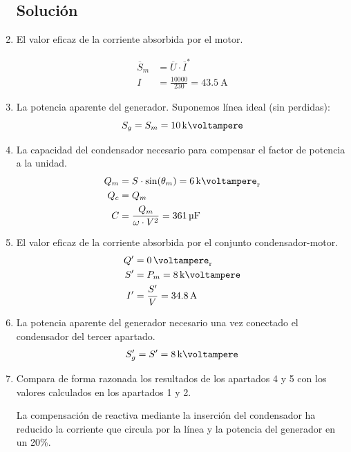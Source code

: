 \begin{enumerate}

\subsection*{Solución}

\item El valor eficaz de la corriente absorbida por el motor.


  \begin{align*}
  \overline{S}_m &= \overline{U} \cdot \overline{I}^*\\
%
  I &= \frac{\num{10000}}{230} = \qty{43.5}{\ampere}
\end{align*}

\item La potencia aparente del generador.
Suponemos línea ideal (sin perdidas):
\[
  S_g = S_m = \qty{10}{\kilo\voltampere} 
\]

\item La capacidad del condensador necesario para compensar el factor de potencia a la unidad.
\begin{align*}
Q_m &= S \cdot \sin(\theta_m) = \qty{6}{\kilo\voltampere_r}\\
Q_c &= Q_m\\
C &= \frac{Q_m}{\omega \cdot V^2} = \qty{361}{\micro\farad}
\end{align*}

\item El valor eficaz de la corriente absorbida por el conjunto condensador-motor. 
\begin{align*}
Q' &= \qty{0}{\voltampere_r}\\
S' &= P_m = \qty{8}{\kilo\voltampere}\\
I' &= \frac{S'}{V} = \qty{34.8}{\ampere}
\end{align*}

\item La potencia aparente del generador necesario una vez conectado el condensador del tercer apartado.
\begin{align*}
S'_g &= S' = \qty{8}{\kilo\voltampere}\\
\end{align*}

\item Compara de forma razonada los resultados de los apartados 4 y 5 con los valores calculados en los apartados 1 y 2.

  La compensación de reactiva mediante la inserción del condensador ha reducido la corriente que circula por la línea y la potencia del generador en un 20\%.

\end{enumerate}

